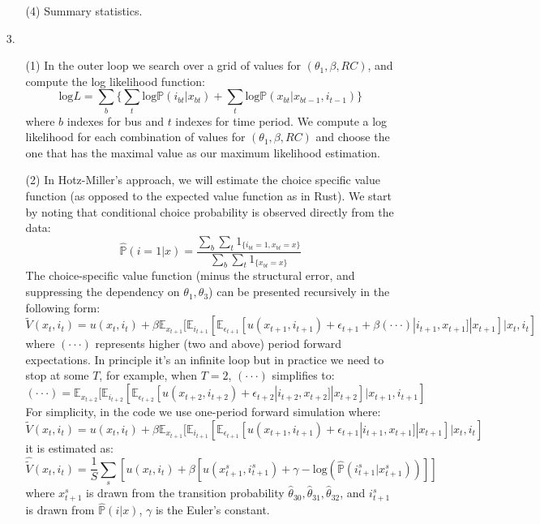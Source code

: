 \documentclass[paper=a4, fontsize=11pt]{scrartcl} %
\numberwithin{equation}{section} %
\numberwithin{figure}{section} %
\numberwithin{table}{section} %
\begin{document}
\begin{itemize}
\begin{itemize}
\item[(4)]
Summary statistics.

\end{itemize}

\item[3.]
\begin{itemize}
\item[(1)] In the outer loop we search over a grid of values for $(\theta_1, \beta, RC)$, and compute the log likelihood function:
\[\text{log}L = \sum_{b} \{\sum_{t} \text{log} \mathbb{P}(i_{bt}|x_{bt}) + \sum_t \text{log} \mathbb{P}(x_{bt}|x_{bt-1},i_{t-1})\}\]
where $b$ indexes for bus and $t$ indexes for time period. We compute a log likelihood for each combination of values for $(\theta_1, \beta, RC)$ and choose the one that has the maximal value as our maximum likelihood estimation.

\item[(2)] In Hotz-Miller's approach, we will estimate the choice specific value function (as opposed to the expected value function as in Rust). We start by noting that conditional choice probability is observed directly from the data:
\[\hat{\mathbb{P}}(i=1|x) = \frac{\sum_{b}\sum_{t} 1_{\{i_{bt}=1, x_{bt}=x\}}}{\sum_{b}\sum_{t} 1_{\{x_{bt}=x\}}}\]
The choice-specific value function (minus the structural error, and suppressing the dependency on $\theta_1, \theta_3$) can be presented recursively in the following form:
\[\tilde{V}(x_t,i_t) = u(x_t,i_t)+\beta\mathbb{E}_{x_{t+1}}[\mathbb{E}_{i_{t+1}}[\mathbb{E}_{\epsilon_{t+1}}[u(x_{t+1},i_{t+1})+\epsilon_{t+1}+\beta(\cdot\cdot\cdot)|i_{t+1},x_{t+1}]|x_{t+1}]|x_t,i_t]\]
where $(\cdot\cdot\cdot)$ represents higher (two and above) period forward expectations. In principle it's an infinite loop but in practice we need to stop at some $T$, for example, when $T=2$, $(\cdot\cdot\cdot)$ simplifies to:
\[(\cdot\cdot\cdot) = \mathbb{E}_{x_{t+2}}[\mathbb{E}_{i_{t+2}}[\mathbb{E}_{\epsilon_{t+2}}[u(x_{t+2},i_{t+2})+\epsilon_{t+2}|i_{t+2},x_{t+2}]|x_{t+2}]|x_{t+1},i_{t+1}]\]
For simplicity, in the code we use one-period forward simulation where:
\[\tilde{V}(x_t,i_t) = u(x_t,i_t)+\beta\mathbb{E}_{x_{t+1}}[\mathbb{E}_{i_{t+1}}[\mathbb{E}_{\epsilon_{t+1}}[u(x_{t+1},i_{t+1})+\epsilon_{t+1}|i_{t+1},x_{t+1}]|x_{t+1}]|x_t,i_t]\]
it is estimated as:
\[\hat{\tilde{V}}(x_t,i_t) = \frac{1}{S} \sum_{s} [u(x_t,i_t)+\beta[u(x^s_{t+1},i^s_{t+1})+\gamma -\text{log}(\hat{\mathbb{P}}(i^s_{t+1}|x^s_{t+1}))]]\]
where $x^s_{t+1}$ is drawn from the transition probability $\hat{\theta}_{30}, \hat{\theta}_{31}, \hat{\theta}_{32}$, and $i^s_{t+1}$ is drawn from $\hat{\mathbb{P}}(i|x)$, $\gamma$ is the Euler's constant. 


\end{itemize}

\end{itemize}
\end{document}

